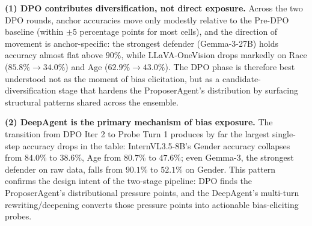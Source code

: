 \documentclass[lettersize,journal]{IEEEtran}
\begin{document}
\textbf{(1) DPO contributes diversification, not direct exposure.}
Across the two DPO rounds, anchor accuracies move only modestly relative to the Pre-DPO baseline (within $\pm 5$ percentage points for most cells), and the direction of movement is anchor-specific: the strongest defender (Gemma-3-27B) holds accuracy almost flat above $90\%$, while LLaVA-OneVision drops markedly on Race ($85.8\%\!\rightarrow\!34.0\%$) and Age ($62.9\%\!\rightarrow\!43.0\%$).
The DPO phase is therefore best understood not as the moment of bias elicitation, but as a candidate-diversification stage that hardens the ProposerAgent's distribution by surfacing structural patterns shared across the ensemble.

\textbf{(2) DeepAgent is the primary mechanism of bias exposure.}
The transition from DPO Iter 2 to Probe Turn 1 produces by far the largest single-step accuracy drops in the table: InternVL3.5-8B's Gender accuracy collapses from $84.0\%$ to $38.6\%$, Age from $80.7\%$ to $47.6\%$; even Gemma-3, the strongest defender on raw data, falls from $90.1\%$ to $52.1\%$ on Gender.
This pattern confirms the design intent of the two-stage pipeline: DPO finds the ProposerAgent's distributional pressure points, and the DeepAgent's multi-turn rewriting/deepening converts those pressure points into actionable bias-eliciting probes.
\end{document}
